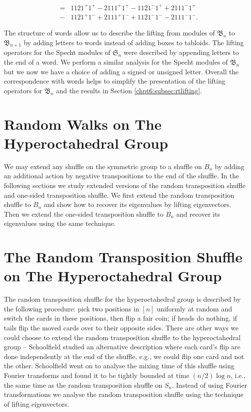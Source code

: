 \documentclass[11pt]{report}
\begin{document}
\begin{eqnarray}
& = &1121^{+}1^{+} - 2111^{+}1^{+} - 1121^{-}1^{+} + 2111^{-}1^{+} \nonumber \\
& - &  1121^{+}1^{-} + 2111^{+}1^{-} + 1121^{-}1^{-} - 2111^{-}1^{-}. \label{chpt6:eqn:polytabexample}
\end{eqnarray}

The structure of words allow us to describe the lifting from modules of $\mathfrak{B}_{n}$ to $\mathfrak{B}_{n+1}$ by adding letters to words instead of adding boxes to tabloids. The lifting operators for the Specht modules of $\mathfrak{S}_{n}$ were described by appending letters to the end of a word. We perform a similar analysis for the Specht modules of $\mathfrak{B}_{n}$ but we now we have a choice of adding a signed or unsigned letter. Overall the correspondence with words helps to simplify the presentation of the lifting operators for $\mathfrak{B}_{n}$ and the results in Section \ref{chpt6:subsec:rtlifting}.  




\section*{Random Walks on The Hyperoctahedral Group}
\label{chpt6:sec:randomwalks}

We may extend any shuffle on the symmetric group to a shuffle on $B_{n}$ by adding an additional action by negative transpositions to the end of the shuffle. In the following sections we study extended versions of the random transposition shuffle and one-sided transposition shuffle. We first extend the random transposition shuffle to $B_{n}$ and show how to recover its eigenvalues by lifting eigenvectors. Then we extend the one-sided transposition shuffle to $B_{n}$ and recover its eigenvalues using the same technique. 


\section{The Random Transposition Shuffle on The Hyperoctahedral Group}
\label{chpt6:subsec:rt}

The random transposition shuffle for the hyperoctahedral group is described by the following procedure: pick two positions in $[n]$ uniformly at random and switch the cards in these positions, then flip a fair coin; if heads do nothing, if tails flip the moved cards over to their opposite sides. There are other ways we could choose to extend the random transposition shuffle to the hyperoctahedral group -- Schoolfield \cite{schoolfield2002random} studied an alternative description where each card's flip are done independently at the end of the shuffle, e.g., we could flip one card and not the other. Schoolfield went on to analyse the mixing time of this shuffle using Fourier transforms and found it to be tightly bounded at time $(n/2)\log n$, i.e., the same time as the random transposition shuffle on $S_{n}$. Instead of using Fourier transformations we analyse the random transposition shuffle using the technique of lifting eigenvectors.
\end{document}
